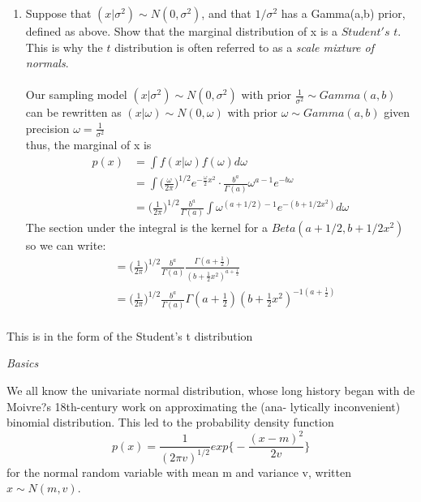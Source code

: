 \documentclass{homework}
\begin{document}
\begin{enumerate}[label=(\Alph*)]
\item Suppose that $(x | \sigma^2) \sim N(0, \sigma^2)$, and that $1/\sigma^2$ has a Gamma(a,b) prior, defined as above. Show that the marginal distribution of x is a $Student's$ $t$. \\This is why the $t$ distribution is often referred to as a \textit{scale mixture of normals}.\\
\\ Our sampling model $(x | \sigma^2) \sim N(0, \sigma^2)$ with prior $\frac{1}{\sigma^ 2} \sim Gamma(a,b)$\\ can be rewritten as  $(x | \omega) \sim N(0, \omega)$ with prior $\omega \sim Gamma(a,b)$ given precision $\omega = \frac{1}{\sigma^2}$\\
thus, the marginal of x is 
\begin{equation} \begin{split}
p(x) &= \int f(x|\omega) f(\omega) d\omega \\
& = \int \big( \frac{\omega}{2\pi} \big)^{1/2} e^{-\frac{\omega}{2}x^2} \cdot \frac{ b^{a}}{\Gamma(a)}\omega^{a-1}e^{-b\omega}\\
& = \big( \frac{1}{2\pi} \big)^{1/2} \frac{ b^{a}}{\Gamma(a)} \int \omega^{(a + 1/2) - 1}e^{-(b + 1/2x^2)}d \omega
 \end{split}  \end{equation}
 The section under the integral is the kernel for a $Beta(a + 1/2, b + 1/2x^2)$ so we can write:
 \begin{equation} \begin{split}
 & = \big( \frac{1}{2\pi} \big)^{1/2} \frac{ b^{a}}{\Gamma(a)} \frac{ \Gamma(a + \frac{1}{2})}{(b + \frac{1}{2}x^2)^{a + \frac{1}{2}}} \\
 & =  \big( \frac{1}{2\pi} \big)^{1/2} \frac{ b^{a}}{\Gamma(a)}  \Gamma(a + \frac{1}{2})(b + \frac{1}{2}x^2)^{-1(a + \frac{1}{2})} \\
\end{split}  \end{equation}
\end{enumerate}
This is in the form of the Student's t distribution

\textit{Basics}
\par \noindent We all know the univariate normal distribution, whose long history began with de Moivre?s 18th-century work on approximating the (ana- lytically inconvenient) binomial distribution. This led to the probability density function 
$$p( x ) = \frac{1}{{(2\pi v)}^{1/2}} exp\big\{-\frac{(x - m)^2}{2v}\big\}$$
for the normal random variable with mean m and variance v, written $x \sim N(m, v)$.
\end{document}
